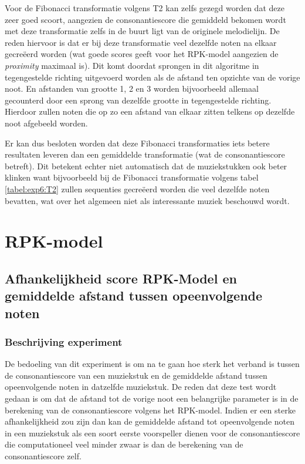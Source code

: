 Voor de Fibonacci transformatie volgens T2 kan zelfs gezegd worden dat deze zeer goed scoort, aangezien de consonantiescore die gemiddeld bekomen wordt met deze transformatie zelfs in de buurt ligt van de originele melodielijn. De reden hiervoor is dat er bij deze transformatie veel dezelfde noten na elkaar gecre\"eerd worden (wat goede scores geeft voor het RPK-model aangezien de \textit{proximity} maximaal is). Dit komt doordat sprongen in dit algoritme in tegengestelde richting uitgevoerd worden als de afstand ten opzichte van de vorige noot. En afstanden van grootte 1, 2 en 3 worden bijvoorbeeld allemaal gecounterd door een sprong van dezelfde grootte in tegengestelde richting. Hierdoor zullen noten die op zo een afstand van elkaar zitten telkens op dezelfde noot afgebeeld worden.

Er kan dus besloten worden dat deze Fibonacci transformaties iets betere resultaten leveren dan een gemiddelde transformatie (wat de consonantiescore betreft). Dit betekent echter niet automatisch dat de muziekstukken ook beter klinken want bijvoorbeeld bij de Fibonacci transformatie volgens tabel \ref{tabel:exp6:T2} zullen sequenties gecre\"eerd worden die veel dezelfde noten bevatten, wat over het algemeen niet als interessante muziek beschouwd wordt.

\section{RPK-model}
\subsection{Afhankelijkheid score RPK-Model en gemiddelde afstand tussen opeenvolgende noten}
\label{experiment:10}
\subsubsection{Beschrijving experiment}
De bedoeling van dit experiment is om na te gaan hoe sterk het verband is tussen de consonantiescore van een muziekstuk en de gemiddelde afstand tussen opeenvolgende noten in datzelfde muziekstuk. De reden dat deze test wordt gedaan is om dat de afstand tot de vorige noot een belangrijke parameter is in de berekening van de consonantiescore volgens het RPK-model. Indien er een sterke afhankelijkheid zou zijn dan kan de gemiddelde afstand tot opeenvolgende noten in een muziekstuk als een soort eerste voorspeller dienen voor de consonantiescore die computationeel veel minder zwaar is dan de berekening van de consonantiescore zelf.

